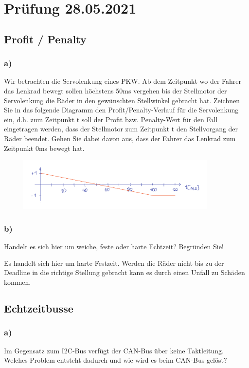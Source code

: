 \section{Prüfung 28.05.2021}
\subsection{Profit / Penalty}
\subsubsection{a)}
Wir betrachten die Servolenkung eines PKW. Ab dem Zeitpunkt wo der Fahrer das Lenkrad bewegt
sollen höchstens 50ms vergehen bis der Stellmotor der Servolenkung die Räder in den gewünschten
Stellwinkel gebracht hat.
Zeichnen Sie in das folgende Diagramm den Profit/Penalty-Verlauf für die Servolenkung ein, d.h. zum
Zeitpunkt t soll der Profit bzw. Penalty-Wert für den Fall eingetragen werden, dass der Stellmotor zum
Zeitpunkt t den Stellvorgang der Räder beendet. Gehen Sie dabei davon aus, dass der Fahrer das
Lenkrad zum Zeitpunkt 0ms bewegt hat.
\begin{figure}[H]
  \includegraphics[width=10cm]{images/KA280521/1a.PNG}
  \centering
\end{figure}

\subsubsection{b)}
Handelt es sich hier um weiche, feste oder harte Echtzeit? Begründen Sie!

Es handelt sich hier um harte Festzeit. Werden die Räder nicht bis zu der Deadline in die richtige Stellung gebracht 
kann es durch einen Unfall zu Schäden kommen.

\subsection{Echtzeitbusse}
\subsubsection{a)}
Im Gegensatz zum I2C-Bus verfügt der CAN-Bus über keine Taktleitung. Welches Problem entsteht
dadurch und wie wird es beim CAN-Bus gelöst?

